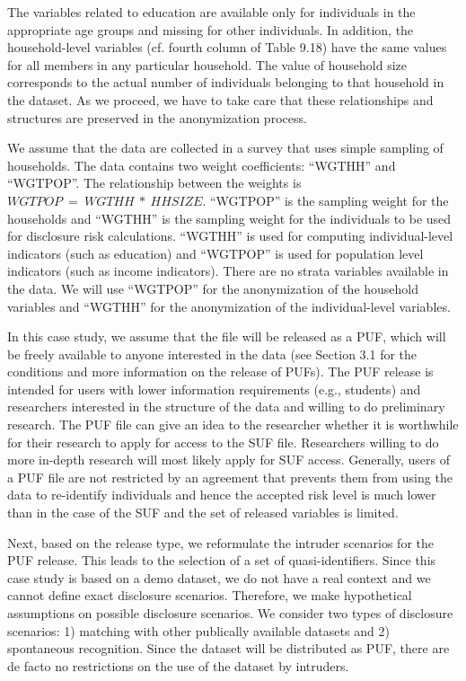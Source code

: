 \documentclass[letterpaper,10pt,english]{sphinxmanual}
\begin{document}
The variables related to education are available only for individuals in
the appropriate age groups and missing for other individuals. In
addition, the household-level variables (cf. fourth column of Table
9.18) have the same values for all members in any particular household.
The value of household size corresponds to the actual number of
individuals belonging to that household in the dataset. As we proceed,
we have to take care that these relationships and structures are
preserved in the anonymization process.

We assume that the data are collected in a survey that uses simple
sampling of households. The data contains two weight coefficients:
“WGTHH” and “WGTPOP”. The relationship between the weights is
\(WGTPOP\  = \ WGTHH\ *\ HHSIZE\). “WGTPOP” is the sampling weight
for the households and “WGTHH” is the sampling weight for the
individuals to be used for disclosure risk calculations. “WGTHH” is used
for computing individual-level indicators (such as education) and
“WGTPOP” is used for population level indicators (such as income
indicators). There are no strata variables available in the data. We
will use “WGTPOP” for the anonymization of the household variables and
“WGTHH” for the anonymization of the individual-level variables.


In this case study, we assume that the file will be released as a PUF,
which will be freely available to anyone interested in the data (see
Section 3.1 for the conditions and more information on the release of
PUFs). The PUF release is intended for users with lower information
requirements (e.g., students) and researchers interested in the
structure of the data and willing to do preliminary research. The PUF
file can give an idea to the researcher whether it is worthwhile for
their research to apply for access to the SUF file. Researchers willing
to do more in-depth research will most likely apply for SUF access.
Generally, users of a PUF file are not restricted by an agreement that
prevents them from using the data to re-identify individuals and hence
the accepted risk level is much lower than in the case of the SUF and
the set of released variables is limited.


Next, based on the release type, we reformulate the intruder scenarios
for the PUF release. This leads to the selection of a set of
quasi-identifiers. Since this case study is based on a demo dataset, we
do not have a real context and we cannot define exact disclosure
scenarios. Therefore, we make hypothetical assumptions on possible
disclosure scenarios. We consider two types of disclosure scenarios: 1)
matching with other publically available datasets and 2) spontaneous
recognition. Since the dataset will be distributed as PUF, there are de
facto no restrictions on the use of the dataset by intruders.
\end{document}
